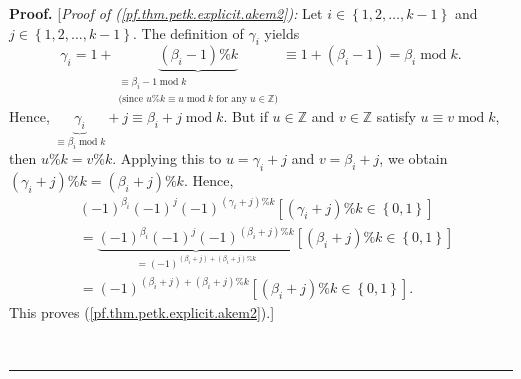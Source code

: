 \documentclass[numbers=enddot,12pt,final,onecolumn,notitlepage]{scrartcl}%
\theoremstyle{definition}
\newenvironment{proof}[1][Proof]{\noindent\textbf{#1.} }{\ \rule{0.5em}{0.5em}}
\newenvironment{vershort}{}{}
\begin{document}
\begin{proof}
\begin{vershort}
[\textit{Proof of (\ref{pf.thm.petk.explicit.akem2}):} Let $i\in\left\{
1,2,\ldots,k-1\right\}  $ and $j\in\left\{  1,2,\ldots,k-1\right\}  $. The
definition of $\gamma_{i}$ yields%
\[
\gamma_{i}=1+\underbrace{\left(  \beta_{i}-1\right)  \%k}_{\substack{\equiv
\beta_{i}-1\operatorname{mod}k\\\text{(since }u\%k\equiv u\operatorname{mod}%
k\text{ for any }u\in\mathbb{Z}\text{)}}}\equiv1+\left(  \beta_{i}-1\right)
=\beta_{i}\operatorname{mod}k.
\]
Hence, $\underbrace{\gamma_{i}}_{\equiv\beta_{i}\operatorname{mod}k}%
+j\equiv\beta_{i}+j\operatorname{mod}k$. But if $u\in\mathbb{Z}$ and
$v\in\mathbb{Z}$ satisfy $u\equiv v\operatorname{mod}k$, then $u\%k=v\%k$.
Applying this to $u=\gamma_{i}+j$ and $v=\beta_{i}+j$, we obtain $\left(
\gamma_{i}+j\right)  \%k=\left(  \beta_{i}+j\right)  \%k$. Hence,%
\begin{align*}
&  \left(  -1\right)  ^{\beta_{i}}\left(  -1\right)  ^{j}\left(  -1\right)
^{\left(  \gamma_{i}+j\right)  \%k}\left[  \left(  \gamma_{i}+j\right)
\%k\in\left\{  0,1\right\}  \right] \\
&  =\underbrace{\left(  -1\right)  ^{\beta_{i}}\left(  -1\right)  ^{j}\left(
-1\right)  ^{\left(  \beta_{i}+j\right)  \%k}}_{=\left(  -1\right)  ^{\left(
\beta_{i}+j\right)  +\left(  \beta_{i}+j\right)  \%k}}\left[  \left(
\beta_{i}+j\right)  \%k\in\left\{  0,1\right\}  \right] \\
&  =\left(  -1\right)  ^{\left(  \beta_{i}+j\right)  +\left(  \beta
_{i}+j\right)  \%k}\left[  \left(  \beta_{i}+j\right)  \%k\in\left\{
0,1\right\}  \right]  .
\end{align*}
This proves (\ref{pf.thm.petk.explicit.akem2}).]
\end{vershort}


\end{proof}
\end{document}
